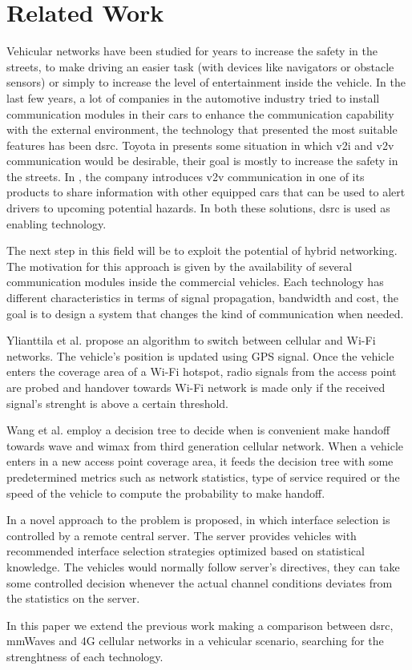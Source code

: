
\section{Related Work}
\label{sec:related_work}

Vehicular networks have been studied for years to increase the safety in the streets, to make driving an easier task (with devices like navigators or obstacle sensors) or simply to increase the level of entertainment inside the vehicle.
In the last few years, a lot of companies in the automotive industry tried to install communication modules in their cars to enhance the communication capability with the external environment, the technology that presented the most suitable features has been \gls{dsrc}.
Toyota in \cite{Toyota15} presents some situation in which \gls{v2i} and \gls{v2v} communication would be desirable, their goal is mostly to increase the safety in the streets. In \cite{Cadillac17}, the company introduces \gls{v2v} communication in one of its products to share information with other equipped cars that can be used to alert drivers to upcoming potential hazards. In both these solutions, \gls{dsrc} is used as enabling technology.

The next step in this field will be to exploit the potential of hybrid networking. The motivation for this approach is given by the availability of several communication modules inside the commercial vehicles. Each technology has different characteristics in terms of signal propagation, bandwidth and cost, the goal is to design a system that changes the kind of communication when needed.

Ylianttila et al. \cite{Ylianttila05} propose an algorithm to switch between cellular and Wi-Fi networks. The vehicle's position is updated using GPS signal. Once the vehicle enters the coverage area of a Wi-Fi hotspot, radio signals from the access point are probed and handover towards Wi-Fi network is made only if the received signal's strenght is above a certain threshold.

Wang et al. \cite{Wang16} employ a decision tree to decide when is convenient make handoff towards \gls{wave} and \gls{wimax} from third generation cellular network.
When a vehicle enters in a new access point coverage area, it feeds the decision tree with some predetermined metrics such as network statistics, type of service required or the speed of the vehicle to compute the probability to make handoff.

In \cite{Higuchi17} a novel approach to the problem is proposed, in which interface selection is controlled by a remote central server. The server provides vehicles with recommended interface selection strategies optimized based on statistical knowledge. The vehicles would normally follow server's directives, they can take some controlled decision whenever the actual channel conditions deviates from the statistics on the server.

In this paper we extend the previous work making a comparison between \gls{dsrc}, \gls{mmWaves} and 4G cellular networks in a vehicular scenario, searching for the strenghtness of each technology.